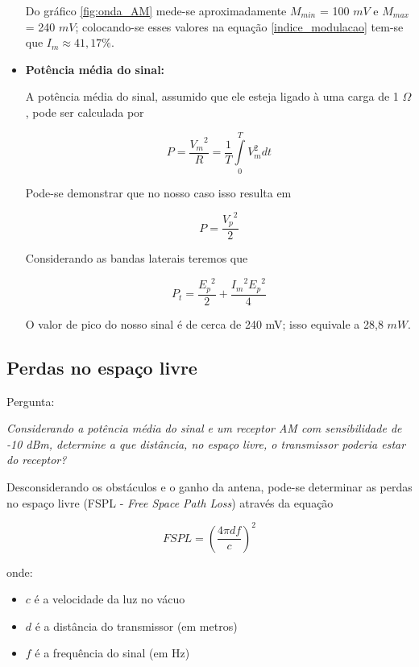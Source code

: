\documentclass[]{report}
\begin{document}
\begin{itemize}
Do gráfico \ref{fig:onda_AM} mede-se aproximadamente $M_{min}$ = 100 $mV$ e $M_{max}$ = 240 $mV$; colocando-se esses valores na equação \ref{indice_modulacao} tem-se que $I_m \approx 41,17 \%$.
\item{\bf Potência média do sinal:}

A potência média do sinal, assumido que ele esteja ligado à uma carga de 1 $\Omega$, pode ser calculada por

\begin{equation}
P = \frac{{V_m}^2}{R} = \frac{1}{T}\int\limits_{0}^{T}{V_m^2}dt
\end{equation}

Pode-se demonstrar que no nosso caso isso resulta em

\begin{equation}
P = \frac{{V_p}^2}{2}
\end{equation}

Considerando as bandas laterais teremos que

\begin{equation}
P_t = \frac{{E_p}^2}{2} + \frac{{I_m}^2 {E_p}^2}{4}
\end{equation}

O valor de pico do nosso sinal é de cerca de 240 mV; isso equivale a 28,8 $mW$.
\end{itemize}



\subsection{Perdas no espaço livre}

Pergunta:
\begin{flushright}
\textit{Considerando a potência média do sinal e um receptor AM com sensibilidade de -10 dBm, determine a que distância, no espaço livre, o transmissor poderia estar do receptor?}
\end{flushright}

Desconsiderando os obstáculos e o ganho da antena, pode-se determinar as perdas no espaço livre (FSPL - \textit{Free Space Path Loss}) através da equação

\begin{equation}\label{fspl}
FSPL = (\frac{4 \pi d f}{c})^2
\end{equation}

onde:
\begin{itemize}
\item $c$ é a velocidade da luz no vácuo
\item $d$ é a distância do transmissor (em metros)
\item $f$ é a frequência do sinal (em Hz)
\end{itemize}
\end{document}
